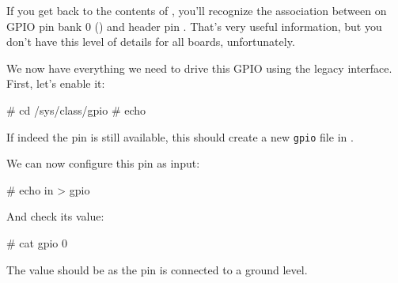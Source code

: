 If you get back to the contents of , you'll
recognize the association between  on GPIO pin bank 0
() and header pin . That's very useful
information, but you don't have this level of details for all boards,
unfortunately.

We now have everything we need to drive this GPIO using the legacy
interface. First, let's enable it:

\begin{bashinput}
# cd /sys/class/gpio
# echo %
\end{bashinput}

If indeed the pin is still available, this should create a new
{\tt gpio\gpionum} file in .

We can now configure this pin as input:

\begin{bashinput}
# echo in > gpio%
\end{bashinput}

And check its value:

\begin{bashinput}
# cat gpio%
0
\end{bashinput}

The value should be  as the pin is connected to a ground level.

